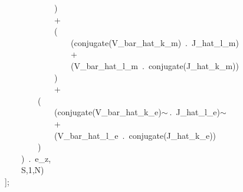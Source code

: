 \documentclass[fleqn]{article}
\begin{document}
\begin{minipage}[t]{\textwidth}
\ \ \ \ \ \ \ \ \ \ \ \ \ \ \ \ )\ \\
\ \ \ \ \ \ \ \ \ \ \ \ \ \ \ \ +\\
\ \ \ \ \ \ \ \ \ \ \ \ \ \ \ \ (\\
\ \ \ \ \ \ \ \ \ \ \ \ \ \ \ \ \ \ \ \ (conjugate(V\_bar\_hat\_k\_m)\ .\ J\_hat\_l\_m)\\
\ \ \ \ \ \ \ \ \ \ \ \ \ \ \ \ \ \ \ \ +\\
\ \ \ \ \ \ \ \ \ \ \ \ \ \ \ \ \ \ \ \ (V\_bar\_hat\_l\_m\ .\ conjugate(J\_hat\_k\_m))\\
\ \ \ \ \ \ \ \ \ \ \ \ \ \ \ \ )\\
\ \ \ \ \ \ \ \ \ \ \ \ \ \ \ \ +\\
\ \ \ \ \ \ \ \ \ \ \ \ (\\
\ \ \ \ \ \ \ \ \ \ \ \ \ \ \ \ (conjugate(V\_bar\_hat\_k\_e)\ensuremath{\sim\ }.\ J\_hat\_l\_e)\ensuremath{\sim\ }\\
\ \ \ \ \ \ \ \ \ \ \ \ \ \ \ \ +\\
\ \ \ \ \ \ \ \ \ \ \ \ \ \ \ \ (V\_bar\_hat\_l\_e\ .\ conjugate(J\_hat\_k\_e))\\
\ \ \ \ \ \ \ \ \ \ \ \ )\\
\ \ \ \ \ \ \ \ )\ .\ e\_z,\\
\ \ \ \ \ \ \ \ S,1,N)\ \ \ \ \\
\ \ \ \ ];
\end{minipage}
\end{document}
